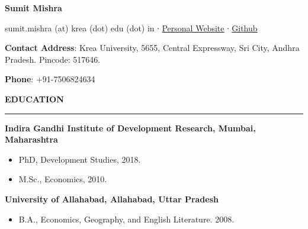 \documentclass[10pt]{article}
\author{}
\date{}
\begin{document}
\ifdefined\Shaded\renewenvironment{Shaded}{\begin{tcolorbox}[breakable, frame hidden, interior hidden, borderline west={3pt}{0pt}{shadecolor}, enhanced, sharp corners, boxrule=0pt]}{\end{tcolorbox}}\fi

\begin{huge}\begin{center}{\bf Sumit Mishra}\end{center}\end{huge}

\begin{center}sumit.mishra (at) krea (dot) edu (dot) in ∙ \href{https://sumitrmishra.github.io/}{Personal Website} ∙ \href{https://github.com/sumitrmishra}{Github} 
\end{center}
\vspace{15pt}




\textbf{Contact Address}: Krea University, 5655, Central Expressway, Sri
City, Andhra Pradesh. Pincode: 517646.

\textbf{Phone}: +91-7506824634

\begin{large}
  {\bf EDUCATION}
\end{large}
  \vspace{3pt}
  \hrule
    \begin{flushleft}{\bf Indira Gandhi Institute of Development Research,
     Mumbai, Maharashtra}\end{flushleft}
     \begin{itemize}
  \item PhD, Development Studies, 2018.
  \item M.Sc., Economics, 2010.
  \end{itemize}

\vspace{0.2cm}

\begin{flushleft}{\bf University of Allahabad, Allahabad, Uttar Pradesh}\end{flushleft}
\begin{itemize}  
	\item B.A., Economics, Geography, and English Literature.  2008.
\end{itemize}
\end{document}
